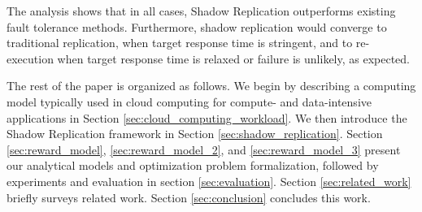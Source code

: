 The analysis shows that in all cases, Shadow Replication outperforms
existing fault tolerance methods. Furthermore, shadow
replication would converge to traditional replication, when target response time is stringent, and to re-execution when target response time is relaxed or failure is unlikely, as expected.

The rest of the paper is organized as follows. We begin by describing a
computing model typically used in cloud computing for compute- and
data-intensive applications in
Section \ref{sec:cloud_computing_workload}. We then introduce
the Shadow Replication framework in
Section \ref{sec:shadow_replication}. Section
\ref{sec:reward_model},  \ref{sec:reward_model_2}, and \ref{sec:reward_model_3} present our analytical models and optimization
problem formalization, followed by experiments and evaluation in
section \ref{sec:evaluation}. Section \ref{sec:related_work} briefly
surveys related work. Section \ref{sec:conclusion} concludes this work.

